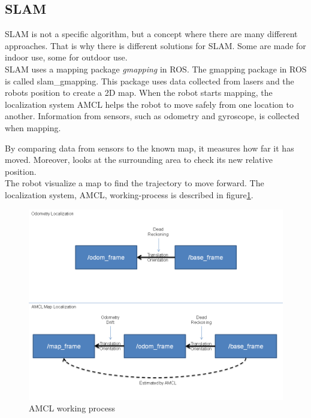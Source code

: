 
\subsection{SLAM}

SLAM is not a specific algorithm, but a concept where there are many different approaches. That is why there is different solutions for SLAM. Some are made for indoor use, some for outdoor use.\\
SLAM uses a mapping package \textit{gmapping} in ROS. The gmapping package in ROS is called slam\_gmapping. This package uses data collected from lasers and the robots position to create a 2D map. %
When the robot starts mapping, the localization system AMCL helps the robot to move safely from one location to another.
Information from sensors, such as odometry and gyroscope, is collected when mapping. 

By comparing data from sensors to the known map, it measures how far it has moved. Moreover, looks at the surrounding area to check its new relative position.\\The robot visualize a map to find the trajectory to move forward. The localization system, AMCL, working-process is described in figure\ref{fig:amcl}.

\begin{figure}[h]
    \centering
    \includegraphics[width=.7\textwidth]{figures/AMCL.png}
    \caption{AMCL working process\cite{AMCL}} 
    \label{fig:amcl} 
\end{figure}

